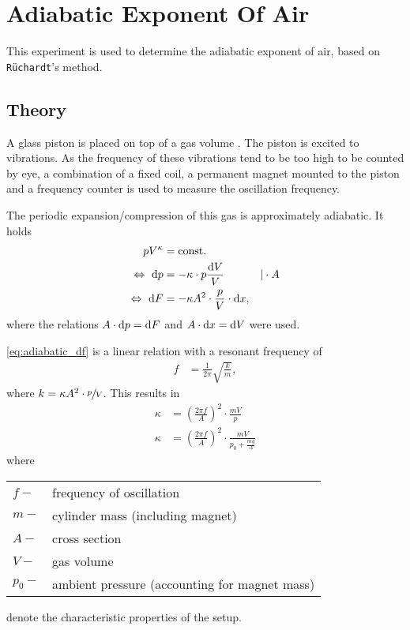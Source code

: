 \chapter{Adiabatic Exponent Of Air}
This experiment is used to determine the adiabatic exponent of air, based on \texttt{Rüchardt}'s method.

\section{Theory}
A glass piston is placed on top of a gas volume .
The piston is excited to vibrations.
As the frequency of these vibrations tend to be too high to be counted by eye, a combination of a fixed coil, a permanent magnet mounted to the piston and a frequency counter is used to measure the oscillation frequency.

The periodic expansion/compression of this gas is approximately adiabatic. It holds
\begin{alignat}{3}
	pV^{\kappa} &= \text{const.} \nonumber \\
	\Leftrightarrow\ \text{d} p &= -\kappa\cdot p\frac{\text{d} V}{V}&|\cdot A \nonumber \\
	\Leftrightarrow\ \text{d} F &= -\kappa A^2\cdot\frac{p}{V}\cdot\text{d} x, \label{eq:adiabatic_df}
\end{alignat}
where the relations $A\cdot \text{d} p=\text{d} F$ and $A\cdot\text{d} x=\text{d} V$ were used.

\autoref{eq:adiabatic_df} is a linear relation with a resonant frequency of
\begin{align*}
	f&=\frac{1}{2\pi}\sqrt{\frac{k}{m}},
\end{align*}
where $k=\kappa A^2\cdot\sfrac{p}{V}$.
This results in
\begin{align}\label{eq:kappa}
	\kappa&=\left(\frac{2\pi f}{A}\right)^2\cdot\frac{mV}{p} \nonumber \\
	\kappa&=\left(\frac{2\pi f}{A}\right)^2\cdot\frac{mV}{p_0+\frac{mg}{A}}
\end{align}
where\par
\begin{tabular}{ll}
	$f-$	&	frequency of oscillation \\
	$m-$	&	cylinder mass (including magnet) \\
	$A-$	&	cross section \\
	$V-$	&	gas volume \\
	$p_0-$	&	ambient pressure (accounting for magnet mass)\\
\end{tabular}\par
denote the characteristic properties of the setup.


